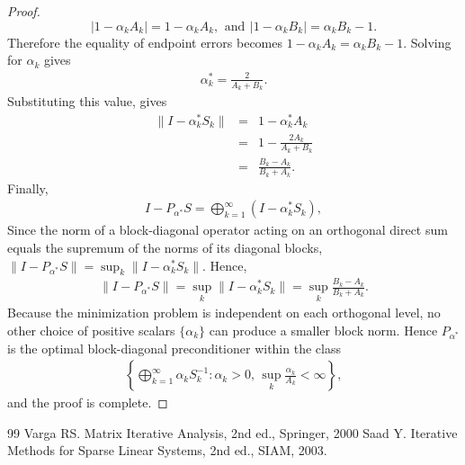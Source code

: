\documentclass[10pt,a4paper]{amsart}
\begin{document}
\begin{proof}
$$|1-\alpha_k A_k| = 1-\alpha_k A_k, \,\ \mbox{and} \,\ |1-\alpha_k B_k| =
\alpha_k B_k-1.$$ Therefore the equality of endpoint errors
becomes $1-\alpha_k A_k = \alpha_k B_k-1$. Solving for $\alpha_k$
gives
\begin{eqnarray*}
\alpha_k^* = \frac{2}{A_k+B_k}.
\end{eqnarray*}
 Substituting this value, gives
\begin{eqnarray*}
\|I-\alpha_k^*S_k\| &=& 1-\alpha_k^*A_k\\ &=&
1-\frac{2A_k}{A_k+B_k}\\ &=& \frac{B_k-A_k}{B_k+A_k}.
\end{eqnarray*}
Finally,
\begin{eqnarray*}
I-P_{\alpha^*}S = \bigoplus_{k=1}^{\infty} (I-\alpha_k^*S_k),
\end{eqnarray*}
Since the norm of a block-diagonal operator acting on an
orthogonal direct sum equals the supremum of the norms of its
diagonal blocks,
 $\|I-P_{\alpha^*}S\| = \sup_k \|I-\alpha_k^*S_k\|$.
Hence,
\begin{eqnarray*}
\|I-P_{\alpha^*}S\| = \sup_k \|I-\alpha_k^*S_k\| = \sup_k
\frac{B_k-A_k}{B_k+A_k}.
\end{eqnarray*}
Because the minimization problem is independent on each orthogonal
level, no other choice of positive scalars $\{\alpha_k\}$ can
produce a smaller block norm. Hence $P_{\alpha^*}$ is the optimal
block-diagonal preconditioner within the class
\begin{eqnarray*}
\left\{ \bigoplus_{k=1}^{\infty}\alpha_kS_k^{-1}: \alpha_k>0,\,
\sup_k\frac{\alpha_k}{A_k}<\infty \right\},
\end{eqnarray*}
and the proof is complete.

\end{proof}


\begin{thebibliography}{99}
 Varga RS. Matrix Iterative Analysis, 2nd ed., Springer, 2000
 Saad Y. Iterative Methods for Sparse Linear Systems, 2nd ed., SIAM, 2003.
\end{thebibliography}
\end{document}
